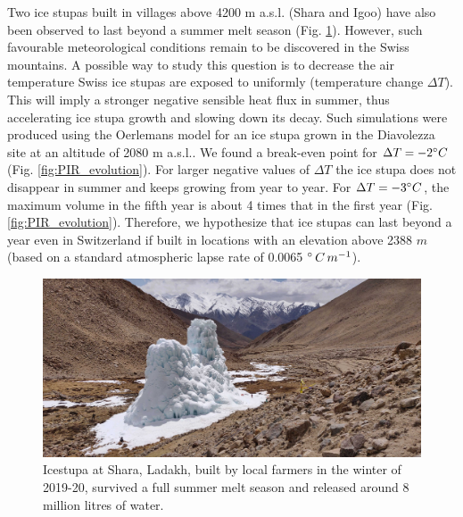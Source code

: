 Two ice stupas built in villages above 4200 m \ac{a.s.l.} (Shara and Igoo) have also been observed to last
beyond a summer melt season (Fig. \ref{fig:PIR}). However, such favourable meteorological conditions remain to
be discovered in the Swiss mountains. A possible way to study this question is to decrease the air temperature
Swiss ice stupas are exposed to uniformly (temperature change $\Delta T$). This will imply a stronger negative
sensible heat flux in summer, thus accelerating ice stupa growth and slowing down its decay. Such simulations
were produced using the Oerlemans model for an ice stupa grown in the Diavolezza site at an altitude of 2080 m
\ac{a.s.l.}. We found a break-even point for $\Delta T = -2 ^{\circ} C$ (Fig. \ref{fig:PIR_evolution}). For
larger negative values of $\Delta T$ the ice stupa does not disappear in summer and keeps growing from year to
year. For $\Delta T = -3 ^{\circ} C$, the maximum volume in the fifth year is about 4 times that in the first
year (Fig. \ref{fig:PIR_evolution}). Therefore, we hypothesize that ice stupas can last beyond a year even in
Switzerland if built in locations with an elevation above 2388 $m$ (based on a standard atmospheric lapse rate
of 0.0065 $^{\circ}\,C\,m^{-1}$).

\begin{figure}[htb]
	\centering
	\includegraphics[width=\textwidth]{figs/PIR_example.jpg}

	\caption{Icestupa at Shara, Ladakh, built by local farmers in the winter of 2019-20, survived a full summer melt season and released
		around 8 million litres of water.}

	\label{fig:PIR}
\end{figure}

